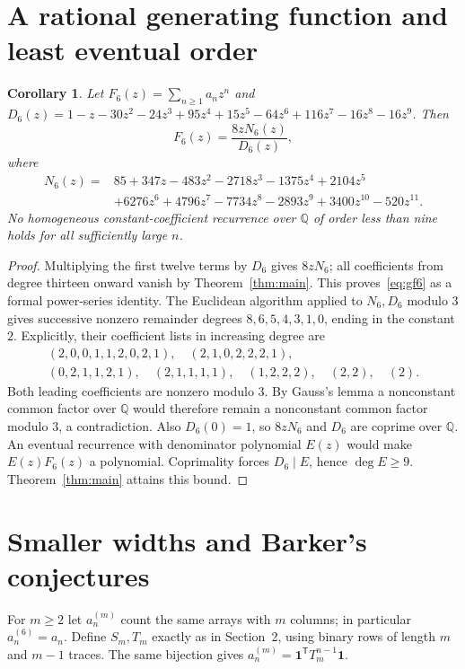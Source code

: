 \documentclass[11pt]{article}
\newtheorem{corollary}[theorem]{Corollary}
\begin{document}
\section{A rational generating function and least eventual order}
\begin{corollary}\label{cor:minimal}
Let $F_6(z)=\sum_{n\geq1}a_nz^n$ and
$D_6(z)=1-z-30z^2-24z^3+95z^4+15z^5-64z^6+116z^7-16z^8-16z^9$.
Then
\begin{equation}\label{eq:gf6}
 F_6(z)=\frac{8zN_6(z)}{D_6(z)},
\end{equation}
where
\begin{align*}
N_6(z)={}&85+347z-483z^2-2718z^3-1375z^4+2104z^5\\
 &+6276z^6+4796z^7-7734z^8-2893z^9+3400z^{10}-520z^{11}.
\end{align*}
No homogeneous constant-coefficient recurrence over $\mathbb Q$ of
order less than nine holds for all sufficiently large $n$.
\end{corollary}
\begin{proof}
Multiplying the first twelve terms by $D_6$ gives $8zN_6$;
all coefficients from degree thirteen onward vanish by
Theorem~\ref{thm:main}. This proves~\eqref{eq:gf6} as a formal power-series
identity. The Euclidean algorithm applied to $N_6,D_6$ modulo $3$ gives
successive nonzero remainder degrees $8,6,5,4,3,1,0$, ending in the
constant $2$. Explicitly, their coefficient lists in increasing degree are
\[
\begin{gathered}
(2,0,0,1,1,2,0,2,1),\quad(2,1,0,2,2,2,1),\\
(0,2,1,1,2,1),\quad(2,1,1,1,1),\quad(1,2,2,2),\quad(2,2),\quad(2).
\end{gathered}
\]
Both leading coefficients are nonzero modulo $3$. By Gauss's lemma a
nonconstant common factor over $\mathbb Q$ would therefore remain a
nonconstant common factor modulo $3$, a contradiction. Also $D_6(0)=1$,
so $8zN_6$ and $D_6$ are coprime over $\mathbb Q$.
An eventual recurrence with denominator polynomial $E(z)$ would make
$E(z)F_6(z)$ a polynomial. Coprimality forces $D_6\mid E$, hence
$\deg E\geq9$. Theorem~\ref{thm:main} attains this bound.
\end{proof}

\section{Smaller widths and Barker's conjectures}
For $m\geq2$ let $a^{(m)}_n$ count the same arrays with $m$ columns;
in particular $a^{(6)}_n=a_n$. Define $S_m,T_m$ exactly as in Section~2,
using binary rows of length $m$ and $m-1$ traces. The same bijection gives
$a^{(m)}_n=\mathbf1^{\mathsf T}T_m^{n-1}\mathbf1$.
\end{document}
